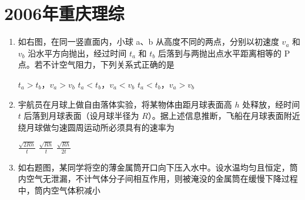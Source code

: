 \documentclass[\gkver]{gaokaozhenti}
\begin{document}
\chapter{2006年重庆理综}

\begin{enumerate}
\item
如右图，在同一竖直面内，小球 a、b 从高度不同的两点，分别以初速度 $v_{a}$ 和 $v_{b}$ 沿水平方向抛出，经过时间 $t_{a}$ 和 $t_{b}$ 后落到与两抛出点水平距离相等的 P 点。若不计空气阻力，下列关系式正确的是

\onepicture[w=4.00cm]{}

{$t_{a}>t_{b}$，$v_{a}>v_{b}$}
{$t_{a}<t_{b}$，$v_{a}<v_{b}$}
{$t_{a}<t_{b}$，$v_{a}>v_{b}$}


\item
宇航员在月球上做自由落体实验，将某物体由距月球表面高 $h$ 处释放，经时间 $t$ 后落到月球表面（设月球半径为 $R$）。据上述信息推断，飞船在月球表面附近绕月球做匀速圆周运动所必须具有的速率为

{$\frac{\sqrt{2Rh}}{t}$}
{$\frac{\sqrt{Rh}}{t}$}
{$\frac{\sqrt{Rh}}{2t}$}


\item
如右题图，某同学将空的薄金属筒开口向下压入水中。设水温均匀且恒定，筒内空气无泄漏，不计气体分子间相互作用，则被淹没的金属筒在缓慢下降过程中，筒内空气体积减小


\end{enumerate}
\end{document}
